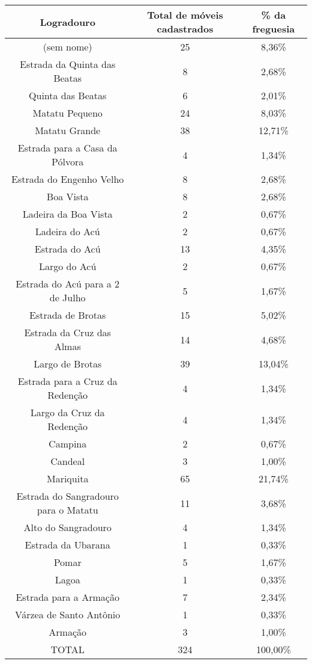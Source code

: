 \begin{table}[!htp]
\centering
{}
{
\begin{tabular}{ccc}
\toprule
Logradouro				&Total de móveis cadastrados	&\% da freguesia	&\\
\midrule \midrule
(sem nome)				&25				&8,36\%			&\\
Estrada da Quinta das Beatas		&8				&2,68\%			&\\
Quinta das Beatas			&6				&2,01\%			&\\
Matatu Pequeno				&24				&8,03\%			&\\
Matatu Grande				&38				&12,71\%		&\\
Estrada para a Casa da Pólvora		&4				&1,34\%			&\\
Estrada do Engenho Velho		&8				&2,68\%			&\\
Boa Vista				&8				&2,68\%			&\\
Ladeira da Boa Vista			&2				&0,67\%			&\\
Ladeira do Acú				&2				&0,67\%			&\\
Estrada do Acú				&13				&4,35\%			&\\
Largo do Acú				&2				&0,67\%			&\\
Estrada do Acú para a 2 de Julho	&5				&1,67\%			&\\
Estrada de Brotas			&15				&5,02\%			&\\
Estrada da Cruz das Almas		&14				&4,68\%			&\\
Largo de Brotas				&39				&13,04\%		&\\
Estrada para a Cruz da Redenção		&4				&1,34\%			&\\
Largo da Cruz da Redenção		&4				&1,34\%			&\\
Campina					&2				&0,67\%			&\\
Candeal					&3				&1,00\%			&\\
Mariquita				&65				&21,74\%		&\\
Estrada do Sangradouro para o Matatu	&11				&3,68\%			&\\
Alto do Sangradouro			&4				&1,34\%			&\\
Estrada da Ubarana			&1				&0,33\%			&\\
Pomar					&5				&1,67\%			&\\
Lagoa					&1				&0,33\%			&\\
Estrada para a Armação			&7				&2,34\%			&\\
Várzea de Santo Antônio			&1				&0,33\%			&\\
Armação					&3				&1,00\%			&\\
\midrule
TOTAL					&324				&100,00\%		&\\
\bottomrule
\end{tabular} 
}
\end{table}

